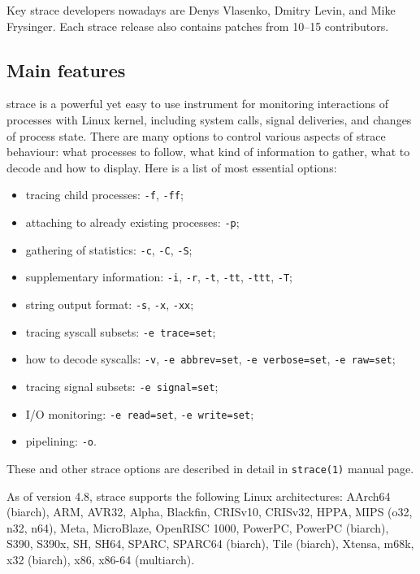 \documentclass[10pt, a5paper]{article}
\def\v!#1!{\texttt{#1}}
\begin{document}
Key strace developers nowadays are Denys Vlasenko, Dmitry Levin, and Mike Frysinger. Each strace release also contains patches from 10--15 contributors.

\subsection*{Main features}

strace is a powerful yet easy to use instrument for monitoring \linebreak interactions of processes with Linux kernel, including system calls, signal deliveries, and changes of process state.  There are many options to control various aspects of strace behaviour: what processes to follow, what kind of information to gather, what to decode and how to display.  Here is a list of most essential options:

\begin{itemize}
  \item tracing child processes: \v!-f!, \v!-ff!;
  \item attaching to already existing processes: \v!-p!;
  \item gathering of statistics: \v!-c!, \v!-C!, \v!-S!;
  \item supplementary information: \v!-i!, \v!-r!, \v!-t!, \v!-tt!, \v!-ttt!, \v!-T!;
  \item string output format: \v!-s!, \v!-x!, \v!-xx!;
  \item tracing syscall subsets: \v!-e trace=set!;
  \item how to decode syscalls: \v!-v!, \v!-e abbrev=set!, \v!-e verbose=set!, \v!-e raw=set!;
  \item tracing signal subsets: \v!-e signal=set!;
  \item I/O monitoring: \v!-e read=set!, \v!-e write=set!;
  \item pipelining: \v!-o!.
\end{itemize}

These and other strace options are described in detail in \v!strace(1)! manual page.

As of version 4.8, strace supports the following Linux architectures: AArch64 (biarch), ARM, AVR32, Alpha, Blackfin, CRISv10, CRISv32, HPPA, MIPS (o32, n32, n64), Meta, MicroBlaze, OpenRISC 1000, PowerPC, PowerPC (biarch), S390, S390x, SH, SH64, SPARC, \linebreak SPARC64 (biarch), Tile (biarch), Xtensa, m68k, x32 (biarch), x86, x86-64 (multiarch).
\end{document}
